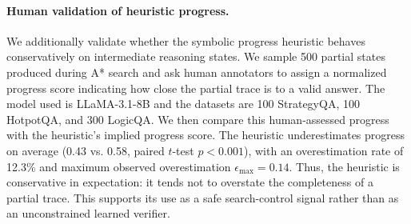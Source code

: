 \documentclass{article}
\begin{document}
\paragraph{Human validation of heuristic progress.}
We additionally validate whether the symbolic progress heuristic behaves
conservatively on intermediate reasoning states. We sample 500 partial
states produced during A* search and ask human annotators to assign a
normalized progress score indicating how close the partial trace is to a
valid answer. The model used is LLaMA-3.1-8B and the datasets are 100 StrategyQA, 100 HotpotQA, and 300 LogicQA. We then compare this human-assessed progress with the
heuristic's implied progress score. The heuristic underestimates progress
on average (0.43 vs. 0.58, paired \(t\)-test \(p<0.001\)), with an
overestimation rate of 12.3\% and maximum observed overestimation
\(\epsilon_{\max}=0.14\). Thus, the heuristic is conservative in
expectation: it tends not to overstate the completeness of a partial
trace. This supports its use as a safe search-control signal rather than
as an unconstrained learned verifier.







\end{document}
